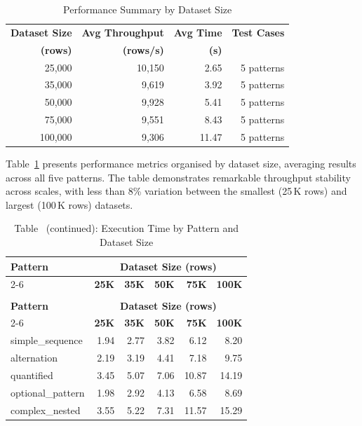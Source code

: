 \begin{table}[H]
\centering
\caption{Performance Summary by Dataset Size}
\label{tab:size_summary}
\begin{tabular}{rrrr}
\toprule
\textbf{Dataset Size} & \textbf{Avg Throughput} & \textbf{Avg Time}
  & \textbf{Test Cases} \\
\textbf{(rows)} & \textbf{(rows/s)} & \textbf{(s)} & \\
\midrule
 25{,}000 & 10{,}150 &  2.65 & 5 patterns \\
 35{,}000 &  9{,}619 &  3.92 & 5 patterns \\
 50{,}000 &  9{,}928 &  5.41 & 5 patterns \\
 75{,}000 &  9{,}551 &  8.43 & 5 patterns \\
100{,}000 &  9{,}306 & 11.47 & 5 patterns \\
\bottomrule
\end{tabular}
\end{table}

Table~\ref{tab:size_summary} presents performance metrics organised by
dataset size, averaging results across all five patterns.  The table
demonstrates remarkable throughput stability across scales, with less
than 8\% variation between the smallest (25\,K rows) and
largest (100\,K rows) datasets.

\begin{longtable}{lrrrrr}
\caption{Execution Time (seconds) by Pattern and Dataset Size}
\label{tab:execution_times} \\
\toprule
\textbf{Pattern} & \multicolumn{5}{c}{\textbf{Dataset Size (rows)}} \\
\cmidrule(lr){2-6}
 & \textbf{25K} & \textbf{35K} & \textbf{50K} & \textbf{75K} & \textbf{100K} \\
\midrule
\endfirsthead
\caption*{Table~\thetable{} (continued): Execution Time by Pattern and Dataset Size} \\
\toprule
\textbf{Pattern} & \multicolumn{5}{c}{\textbf{Dataset Size (rows)}} \\
\cmidrule(lr){2-6}
 & \textbf{25K} & \textbf{35K} & \textbf{50K} & \textbf{75K} & \textbf{100K} \\
\midrule
\endhead
\bottomrule
\endfoot
simple\_sequence  & 1.94 &  2.77 &  3.82 &  6.12 &  8.20 \\
alternation       & 2.19 &  3.19 &  4.41 &  7.18 &  9.75 \\
quantified        & 3.45 &  5.07 &  7.06 & 10.87 & 14.19 \\
optional\_pattern & 1.98 &  2.92 &  4.13 &  6.58 &  8.69 \\
complex\_nested   & 3.55 &  5.22 &  7.31 & 11.57 & 15.29 \\
\end{longtable}

